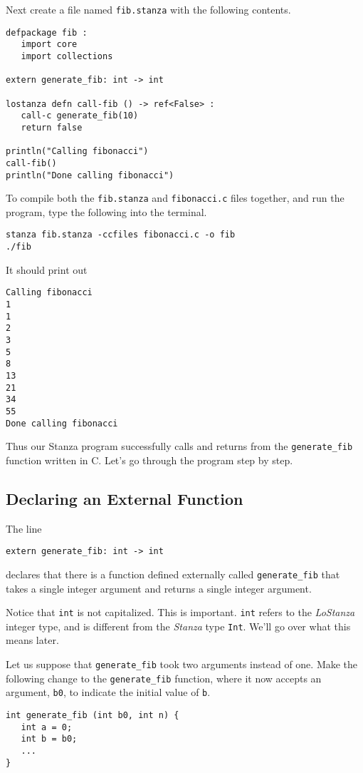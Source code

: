 \documentclass[10pt,oneside]{book}
\begin{document}
Next create a file named \texttt{\frenchspacing fib.stanza} with the following contents.
\begin{lstlisting}
defpackage fib :
   import core
   import collections

extern generate_fib: int -> int

lostanza defn call-fib () -> ref<False> :
   call-c generate_fib(10)
   return false

println("Calling fibonacci")
call-fib()
println("Done calling fibonacci")
\end{lstlisting}

To compile both the \texttt{\frenchspacing fib.stanza} and \texttt{\frenchspacing fibonacci.c} files together, and run the program, type the following into the terminal.
\begin{lstlisting}
stanza fib.stanza -ccfiles fibonacci.c -o fib
./fib
\end{lstlisting}
It should print out
\begin{lstlisting}
Calling fibonacci
1
1
2
3
5
8
13
21
34
55
Done calling fibonacci
\end{lstlisting}

Thus our Stanza program successfully calls and returns from the \texttt{\frenchspacing generate\_fib} function written in C. Let's go through the program step by step.

\subsection*{Declaring an External Function}
The line 
\begin{lstlisting}
extern generate_fib: int -> int
\end{lstlisting}
declares that there is a function defined externally called \texttt{\frenchspacing generate\_fib} that takes a single integer argument and returns a single integer argument.

Notice that \texttt{\frenchspacing int} is not capitalized. This is important. \texttt{\frenchspacing int} refers to the {\em LoStanza} integer type, and is different from the {\em Stanza} type \texttt{\frenchspacing Int}. We'll go over what this means later. 

Let us suppose that \texttt{\frenchspacing generate\_fib} took two arguments instead of one. Make the following change to the \texttt{\frenchspacing generate\_fib} function, where it now accepts an argument, \texttt{\frenchspacing b0}, to indicate the initial value of \texttt{\frenchspacing b}.
\begin{lstlisting}
int generate_fib (int b0, int n) {
   int a = 0;
   int b = b0;
   ...
}   
\end{lstlisting}
\end{document}
